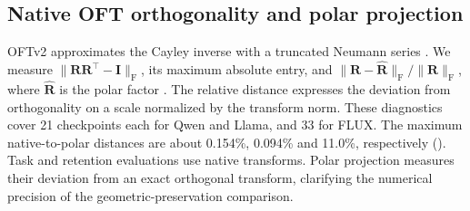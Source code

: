 \subsection{Native OFT orthogonality and polar projection}\label{app:native-orthogonality}
OFTv2 approximates the Cayley inverse with a truncated Neumann series \citep{qiu2025oftv2}. We measure $\|\bm R\bm R^{\!\top}-\bm I\|_{\mathrm{F}}$, its maximum absolute entry, and $\|\bm R-\widehat{\bm R}\|_{\mathrm{F}}/\|\bm R\|_{\mathrm{F}}$, where $\widehat{\bm R}$ is the polar factor \citep{higham1986polar}. The relative distance expresses the deviation from orthogonality on a scale normalized by the transform norm. These diagnostics cover 21 checkpoints each for Qwen and Llama, and 33 for FLUX. The maximum native-to-polar distances are about 0.154\%, 0.094\% and 11.0\%, respectively (). Task and retention evaluations use native transforms. Polar projection measures their deviation from an exact orthogonal transform, clarifying the numerical precision of the geometric-preservation comparison.



